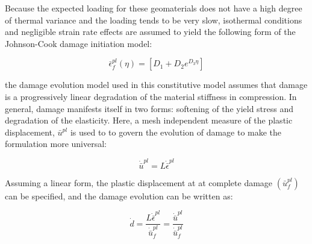 Because the expected loading for these geomaterials does not have a high degree of thermal variance and the loading tends to be very slow, isothermal conditions and negligible strain rate effects are assumed to yield the following form of the Johnson-Cook damage initiation model:

\begin{equation}
\bar{\epsilon}_{f}^{pl}\left(\eta\right)=\left[D_{1}+D_{2}e^{D_{3}\eta}\right]\label{eqn:druc8}
\end{equation}

the damage evolution model used in this constitutive model assumes that damage is a progressively linear degradation of the material stiffness in compression.  In general, damage manifests itself in two forms: softening of the yield stress and degradation of the elasticity. Here, a mesh independent measure of the plastic displacement, $\bar{u}^{pl}$ is used to to govern the evolution of damage to make the formulation more universal:

\begin{equation}
\dot{\bar{u}}^{pl}=L\dot{\bar{\epsilon}}^{pl}\label{eqn:druc9}
\end{equation}


Assuming a linear form, the plastic displacement at at complete damage
$(\bar{u}^{pl}_f)$ can be specified, and the damage evolution can be written as:

\begin{equation}
\dot{d}=\frac{L\dot{\bar{\epsilon}}^{pl}}{\dot{\bar{u}}_{f}^{pl}}=\frac{\dot{\bar{u}}^{pl}}{\dot{\bar{u}}_{f}^{pl}}\label{eqn:druc9-1}
\end{equation}
